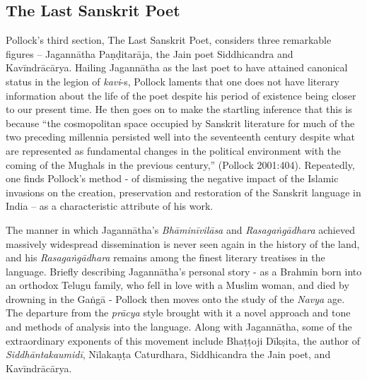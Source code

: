 \subsection{The Last Sanskrit Poet}

Pollock’s third section, The Last Sanskrit Poet, considers three remarkable figures – Jagannātha Paṇḍitarāja, the Jain poet Siddhicandra and Kavīndrācārya. Hailing Jagannātha as the last poet to have attained canonical status in the legion of {\sl kavi}-s, Pollock laments that one does not have literary information about the life of the poet despite his period of existence being closer to our present time. He then goes on to make the startling inference that this is because “the cosmopolitan space occupied by Sanskrit literature for much of the two preceding millennia persisted well into the seventeenth century despite what are represented as fundamental changes in the political environment with the coming of the Mughals in the previous century,” (Pollock 2001:404). Repeatedly, one finds Pollock’s method - of dismissing the negative impact of the Islamic invasions on the creation, preservation and restoration of the Sanskrit language in India – as a characteristic attribute of his work.

The manner in which Jagannātha’s {\sl Bhāminīvilāsa} and {\sl Rasagaṅgādhara} achieved massively widespread dissemination is never seen again in the history of the land, and his {\sl Rasagaṅgādhara} remains among the finest literary treatises in the language. Briefly describing Jagannātha’s personal story - as a Brahmin born into an orthodox Telugu family, who fell in love with a Muslim woman, and died by drowning in the Gaṅgā - Pollock then moves onto the study of the {\sl Navya} age. The departure from the {\sl prācya} style brought with it a novel approach and tone and methods of analysis into the language. Along with Jagannātha, some of the extraordinary exponents of this movement include Bhaṭṭoji Dīkṣita, the author of {\sl Siddhāntakaumidī}, Nīlakaṇṭa Caturdhara, Siddhicandra the Jain poet, and Kavīndrācārya.

